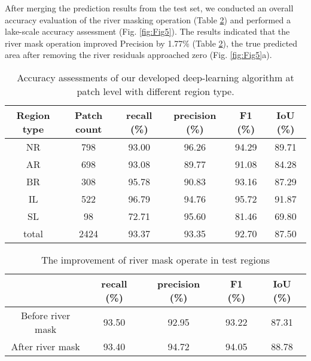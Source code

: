 \documentclass[preprint,12pt,authoryear]{elsarticle}
\begin{document}
After merging the prediction results from the test set, we conducted an overall accuracy evaluation of the river masking operation (Table \ref{tabel2}) and performed a lake-scale accuracy assessment (Fig. \ref{fig:Fig5}). The results indicated that the river mask operation improved Precision by 1.77\% (Table \ref{tabel2}), the true predicted area after removing the river residuals approached zero (Fig. \ref{fig:Fig5}a). 

\begin{table}[t]
    \centering
    \caption{Accuracy assessments of our developed deep-learning algorithm at patch level with different region type.}\label{tabel1}
    \begin{tabular}{cccccc}
    \toprule
    Region type & Patch count & recall (\%)	& precision (\%) & F1 (\%) & IoU (\%) \\
    \midrule
    NR & 798 & 93.00 & 96.26 & 94.29 & 89.71 \\
    AR & 698 & 93.08 & 89.77 & 91.08 & 84.28 \\
    BR & 308 & 95.78 & 90.83 & 93.16 & 87.29 \\
    IL & 522 & 96.79 & 94.76 & 95.72 & 91.87 \\
    SL & 98 & 72.71 & 95.60 & 81.46 & 69.80 \\
    total & 2424 & 93.37 & 93.35 & 92.70 & 87.50 \\
    \bottomrule
    \end{tabular}
    
\end{table}

\begin{table}[t]
    \centering
    \caption{The improvement of river mask operate in test regions}\label{tabel2}
    \begin{tabular}{ccccc}
    \toprule
     & recall (\%)	& precision (\%) & F1 (\%) & IoU (\%) \\
    \midrule
    Before river mask & 93.50  & 92.95  & 93.22  & 87.31 \\
    After river mask & 93.40  & 94.72  & 94.05  & 88.78 \\
    \bottomrule
    \end{tabular}
\end{table}
\end{document}
